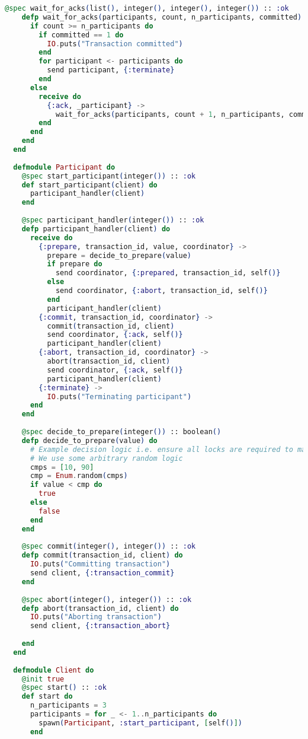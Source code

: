 \begin{lstlisting}[language=Elixir, xleftmargin=.1\linewidth]
    @spec wait_for_acks(list(), integer(), integer(), integer()) :: :ok
    defp wait_for_acks(participants, count, n_participants, committed) do
      if count >= n_participants do
        if committed == 1 do
          IO.puts("Transaction committed")
        end
        for participant <- participants do
          send participant, {:terminate}
        end
      else
        receive do
          {:ack, _participant} ->
            wait_for_acks(participants, count + 1, n_participants, committed)
        end
      end
    end
  end
  
  defmodule Participant do
    @spec start_participant(integer()) :: :ok
    def start_participant(client) do
      participant_handler(client)
    end
  
    @spec participant_handler(integer()) :: :ok
    defp participant_handler(client) do
      receive do
        {:prepare, transaction_id, value, coordinator} ->
          prepare = decide_to_prepare(value)
          if prepare do
            send coordinator, {:prepared, transaction_id, self()}
          else
            send coordinator, {:abort, transaction_id, self()}
          end
          participant_handler(client)
        {:commit, transaction_id, coordinator} ->
          commit(transaction_id, client)
          send coordinator, {:ack, self()}
          participant_handler(client)
        {:abort, transaction_id, coordinator} ->
          abort(transaction_id, client)
          send coordinator, {:ack, self()}
          participant_handler(client)
        {:terminate} ->
          IO.puts("Terminating participant")
      end
    end
  
    @spec decide_to_prepare(integer()) :: boolean()
    defp decide_to_prepare(value) do
      # Example decision logic i.e. ensure all locks are required to make the commit
      # We use some arbitrary random logic
      cmps = [10, 90]
      cmp = Enum.random(cmps)
      if value < cmp do
        true
      else
        false
      end
    end
  
    @spec commit(integer(), integer()) :: :ok
    defp commit(transaction_id, client) do
      IO.puts("Committing transaction")
      send client, {:transaction_commit}
    end
  
    @spec abort(integer(), integer()) :: :ok
    defp abort(transaction_id, client) do
      IO.puts("Aborting transaction")
      send client, {:transaction_abort}
  
    end
  end
  
  defmodule Client do
    @init true
    @spec start() :: :ok
    def start do
      n_participants = 3
      participants = for _ <- 1..n_participants do
        spawn(Participant, :start_participant, [self()])
      end
  

\end{lstlisting}
